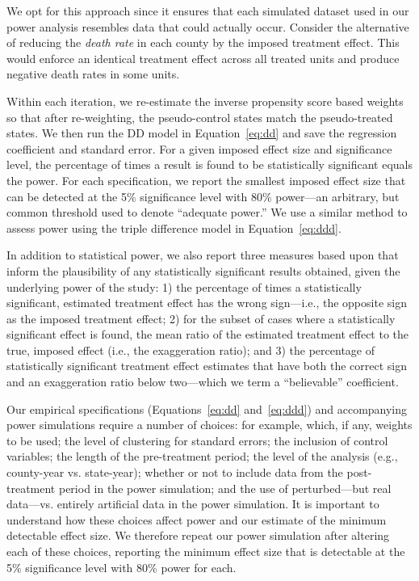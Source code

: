 \documentclass[12pt]{article}%
\begin{document}
We opt for this approach since it ensures that each simulated dataset used in our power analysis resembles data that could actually occur. 
Consider the alternative of reducing the \emph{death rate} in each county by the imposed treatment effect. 
This would enforce an identical treatment effect across all treated units and produce negative death rates in some units.

Within each iteration, we re-estimate the inverse propensity score based weights so that after re-weighting, the pseudo-control states  match the pseudo-treated states. 
We then run the DD model in Equation~\ref{eq:dd} and save the regression coefficient and standard error.  
For a given imposed effect size and significance level, the percentage of times a result is found to be statistically significant equals the power.  
For each specification, we report the smallest imposed effect size that can be detected at the 5\% significance level with 80\% power---an arbitrary, but common threshold used to denote ``adequate power.''
We use a similar method to assess power using the triple difference model in Equation~\ref{eq:ddd}. 

In addition to statistical power, we also report three measures based upon \citet{Gelman2014} that inform the plausibility of any statistically significant results obtained, given the underlying power of the study:  
1) the percentage of times a statistically significant, estimated treatment effect has the wrong sign---i.e., the opposite sign as the imposed treatment effect;
2) for the subset of cases where a statistically significant effect is found, the mean ratio of the estimated treatment effect to the true, imposed effect (i.e., the exaggeration ratio);
and 3) the percentage of statistically significant treatment effect estimates that have both the correct sign and an exaggeration ratio below two---which we term a ``believable'' coefficient. 

Our empirical specifications (Equations~\ref{eq:dd} and~\ref{eq:ddd}) and accompanying power simulations require a number of choices: for example, 
which, if any, weights to be used;
the level of clustering for standard errors; 
the inclusion of control variables; 
the length of the pre-treatment period; 
the level of the analysis (e.g., county-year vs. state-year); 
whether or not to include data from the post-treatment period in the power simulation; 
and the use of perturbed---but real data---vs. entirely artificial data in the power simulation. 
It is important to understand how these choices affect power and our estimate of the minimum detectable effect size. 
We therefore repeat our power simulation after altering each of these choices, reporting the minimum effect size that is detectable at the 5\% significance level with 80\% power for each. 
\end{document}
